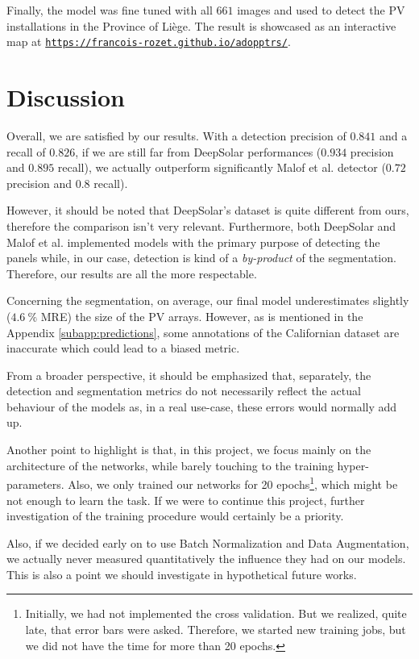 \documentclass[twocolumn,superscriptaddress,aps,nofootinbib]{revtex4-1}
\begin{document}
Finally, the model was fine tuned with all $661$ images and used to detect the PV installations in the Province of Liège. The result is showcased as an interactive map at \texttt{\href{https://francois-rozet.github.io/adopptrs/}{https://francois-rozet.github.io/adopptrs/}}.

\section{Discussion} \label{sec:discussion}

Overall, we are satisfied by our results. With a detection precision of $0.841$ and a recall of $0.826$, if we are still far from DeepSolar \cite{yu2018deepsolar} performances ($0.934$ precision and $0.895$ recall), we actually outperform significantly Malof et al. \cite{malof2016deep} detector ($0.72$ precision and $0.8$ recall).

However, it should be noted that DeepSolar's dataset is quite different from ours, therefore the comparison isn't very relevant. Furthermore, both DeepSolar and Malof et al. implemented models with the primary purpose of detecting the panels while, in our case, detection is kind of a \emph{by-product} of the segmentation. Therefore, our results are all the more respectable.

Concerning the segmentation, on average, our final model underestimates slightly ($\SI{4.6}{\percent}$ MRE) the size of the PV arrays. However, as is mentioned in the Appendix \ref{subapp:predictions}, some annotations of the Californian dataset are inaccurate which could lead to a biased metric.

From a broader perspective, it should be emphasized that, separately, the detection and segmentation metrics do not necessarily reflect the actual behaviour of the models as, in a real use-case, these errors would normally add up.

Another point to highlight is that, in this project, we focus mainly on the architecture of the networks, while barely touching to the training hyper-parameters. Also, we only trained our networks for 20 epochs\footnote{Initially, we had not implemented the cross validation. But we realized, quite late, that error bars were asked. Therefore, we started new training jobs, but we did not have the time for more than 20 epochs.}, which might be not enough to learn the task. If we were to continue this project, further investigation of the training procedure would certainly be a priority.

Also, if we decided early on to use Batch Normalization and Data Augmentation, we actually never measured quantitatively the influence they had on our models. This is also a point we should investigate in hypothetical future works.
\end{document}
